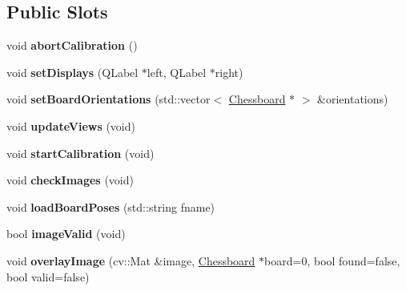 \subsection*{Public Slots}
\begin{DoxyCompactItemize}
\item 
\hypertarget{class_stereo_calibrate_a6e4b4838382adcf8a2cb27b9f37eb110}{}void {\bfseries abort\+Calibration} ()\label{class_stereo_calibrate_a6e4b4838382adcf8a2cb27b9f37eb110}

\item 
\hypertarget{class_stereo_calibrate_a9bab18de2d9dc031100a427f5ffd3124}{}void {\bfseries set\+Displays} (Q\+Label $\ast$left, Q\+Label $\ast$right)\label{class_stereo_calibrate_a9bab18de2d9dc031100a427f5ffd3124}

\item 
\hypertarget{class_stereo_calibrate_ac474055fd6fe2e6072ea0f064e2e42ac}{}void {\bfseries set\+Board\+Orientations} (std\+::vector$<$ \hyperlink{class_chessboard}{Chessboard} $\ast$ $>$ \&orientations)\label{class_stereo_calibrate_ac474055fd6fe2e6072ea0f064e2e42ac}

\item 
\hypertarget{class_stereo_calibrate_a2e3e6d6b3d6de2c593adc57108c265fc}{}void {\bfseries update\+Views} (void)\label{class_stereo_calibrate_a2e3e6d6b3d6de2c593adc57108c265fc}

\item 
\hypertarget{class_stereo_calibrate_aef3fbab18b6c999aa22f06a1f238114e}{}void {\bfseries start\+Calibration} (void)\label{class_stereo_calibrate_aef3fbab18b6c999aa22f06a1f238114e}

\item 
\hypertarget{class_stereo_calibrate_a69e4719c556f500027651b6fc9648f3a}{}void {\bfseries check\+Images} (void)\label{class_stereo_calibrate_a69e4719c556f500027651b6fc9648f3a}

\item 
\hypertarget{class_stereo_calibrate_a579036077efc510864e55ead9e479376}{}void {\bfseries load\+Board\+Poses} (std\+::string fname)\label{class_stereo_calibrate_a579036077efc510864e55ead9e479376}

\item 
\hypertarget{class_stereo_calibrate_a315e6d7c92a006003242ae548f56ca29}{}bool {\bfseries image\+Valid} (void)\label{class_stereo_calibrate_a315e6d7c92a006003242ae548f56ca29}

\item 
\hypertarget{class_stereo_calibrate_acd9488fed7fbb75f1b74f3d5757bbef7}{}void {\bfseries overlay\+Image} (cv\+::\+Mat \&image, \hyperlink{class_chessboard}{Chessboard} $\ast$board=0, bool found=false, bool valid=false)\label{class_stereo_calibrate_acd9488fed7fbb75f1b74f3d5757bbef7}


\end{DoxyCompactItemize}

